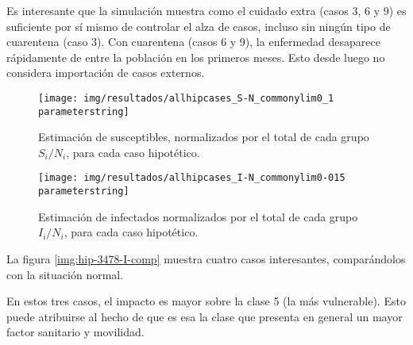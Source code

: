 Es interesante que la simulación muestra como el cuidado extra (casos 3, 6 y 9) es suficiente por sí mismo de controlar el alza de casos, incluso sin ningún tipo de cuarentena (caso 3). Con cuarentena (casos 6 y 9), la enfermedad desaparece rápidamente de entre la población en los primeros meses. Esto desde luego no considera importación de casos externos.

\begin{figure}[h]
\centering
\texttt{[image: img/resultados/allhipcases\_S-N\_commonylim0\_1\\parameterstring]}
\caption{Estimación de susceptibles, normalizados por el total de cada grupo \(S_i/N_i\), para cada caso hipotético.}
\label{img:all-hip-S-N}
\end{figure}

\begin{figure}[h]
\centering
\texttt{[image: img/resultados/allhipcases\_I-N\_commonylim0-015\\parameterstring]}
\caption{Estimación de infectados normalizados por el total de cada grupo \(I_i/N_i\), para cada caso hipotético.}
\label{img:all-hip-I-N}
\end{figure}

La figura \ref{img:hip-3478-I-comp} muestra cuatro casos interesantes, comparándolos con la situación normal. 




En estos tres casos, el impacto es mayor sobre la clase 5 (la más vulnerable). Esto puede atribuirse al hecho de que es esa la clase que presenta en general un mayor factor sanitario y movilidad.




